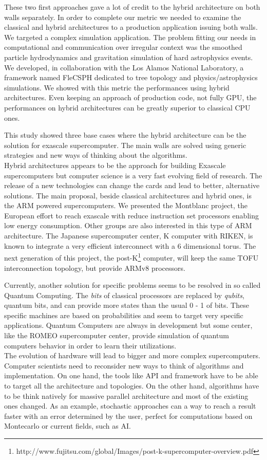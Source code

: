 These two first approaches gave a lot of credit to the hybrid architecture on both walls separately. 
In order to complete our metric we needed to examine the classical and hybrid architectures to a production application issuing both walls. 
We targeted a complex simulation application. 
The problem fitting our needs in computational and communication over irregular context was the smoothed particle hydrodynamics and gravitation simulation of hard astrophysics events. 
We developed, in collaboration with the Los Alamos National Laboratory, a framework named FleCSPH dedicated to tree topology and physics/astrophysics simulations. 
We showed with this metric the performances using hybrid architectures. 
Even keeping an approach of production code, not fully GPU, the performances on hybrid architectures can be greatly superior to classical CPU ones. 

This study showed three base cases where the hybrid architecture can be the solution for exascale supercomputer.
The main walls are solved using generic strategies and new ways of thinking about the algorithms. \\

Hybrid architectures appears to be the approach for building Exascale supercomputers but computer science is a very fast evolving field of research.  
The release of a new technologies can change the cards and lead to better, alternative solutions.
The main proposal, beside classical architectures and hybrid ones, is the ARM powered supercomputers. 
We presented the Montblanc project, the European effort to reach exascale with reduce instruction set processors enabling low energy consumption. 
Other groups are also interested in this type of ARM architecture. 
The Japanese supercomputer center, K computer with RIKEN, is known to integrate a very efficient interconnect with a 6 dimensional torus.
The next generation of this project, the post-K\footnote{http://www.fujitsu.com/global/Images/post-k-supercomputer-overview.pdf} computer, will keep the same TOFU interconnection topology, but provide ARMv8 processors. 

Currently, another solution for specific problems seems to be resolved in so called Quantum Computing.
The \textit{bits} of classical processors are replaced by \textit{qubits}, quantum bits, and can provide more states than the usual 0 - 1 of bits.
These specific machines are based on probabilities and seem to target very specific applications. 
Quantum Computers are always in development but some center, like the ROMEO supercomputer center, provide simulation of quantum computers behavior in order to learn their utilizations.\\

The evolution of hardware will lead to bigger and more complex supercomputers. 
Computer scientists need to reconsider new ways to think of algorithms and implementation. 
On one hand, the tools like API and framework have to be able to target all the architecture and topologies.
On the other hand, algorithms have to be think natively for massive parallel architecture and most of the existing ones changed.
As an example, stochastic approaches can a way to reach a result faster with an error determined by the user, perfect for computations based on Montecarlo or current fields, such as AI. 
